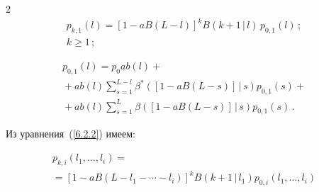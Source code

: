 \begin{multicols}{2}
\begin{multline}


\label{6.2.5}


p_{k,1}(l)=


[1 - a B(L-l)]^k B(k+1\,|\,l)


\,p_{0,1}(l)\,;


\\ 


k\ge 1\,;


\end{multline}





\vspace*{-9pt}





\noindent


\begin{multline}


\label{6.2.6}


p_{0,1}(l)= p_0 a b(l)+{}\\


{}+


a b(l)\sum\limits_{s=1}^{L-l}


\beta^*([1 - a B(L-s)]\,|\,s)


p_{0,1}(s)


 +{}


\\


{}+


a b(l)


\sum\limits_{s=1}^{L}


\beta([1 - a B(L-s)]\,|\,s)


p_{0,1}(s)\,.


\end{multline}







Из уравнения~(\ref{6.2.2}) имеем:




\begin{multline}


p_{k,i}(l_1,\ldots,l_i)


={}\\


{}=[1 - a B(L-l_1-\cdots-l_i)]^k


B(k+1\,|\,l_1) p_{0,i}(l_1,\ldots,l_i)



\end{multline}
\end{multicols}
